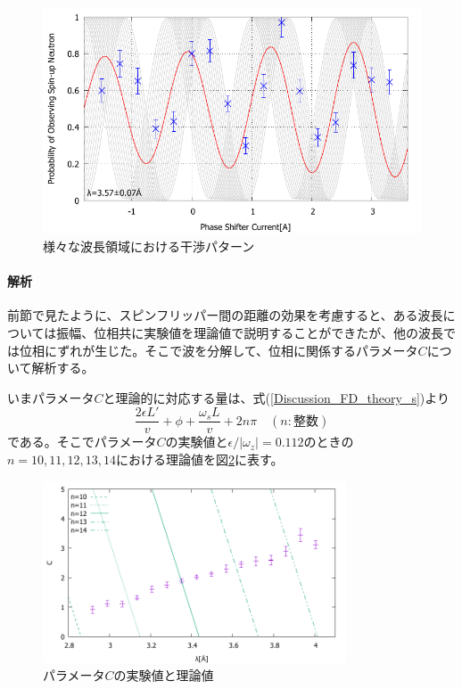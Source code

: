 \begin{figure}[H]
\begin{minipage}{0.5\hsize}
\end{minipage}
\begin{minipage}{0.5\hsize}
\includegraphics[width=\hsize]{discussion/FD/IT_s_500.pdf}
\end{minipage}
\caption{様々な波長領域における干渉パターン}\label{Discussion_FD_fig_s}
\end{figure}

\paragraph{解析}
前節で見たように、スピンフリッパー間の距離の効果を考慮すると、ある波長については振幅、位相共に実験値を理論値で説明することができたが、他の波長では位相にずれが生じた。そこで波を分解して、位相に関係するパラメータ$C$について解析する。

いまパラメータ$C$と理論的に対応する量は、式(\ref{Discussion_FD_theory_s})より
\begin{equation}
\frac{2\epsilon L'}{v} +\phi +\frac{\omega_s L}{v}+2n\pi \quad (n:整数)
\end{equation}
である。そこでパラメータ$C$の実験値と$\epsilon/|\omega_z|=0.112$のときの$n=10, 11, 12, 13, 14$における理論値を図\ref{Discussion_FD_fig_C_s_470_fit}に表す。
\begin{figure}[H]
\centering
\includegraphics[width=9cm]{discussion/FD/C_s_470_fit.pdf}
\caption{パラメータ$C$の実験値と理論値}\label{Discussion_FD_fig_C_s_470_fit}
\end{figure}

